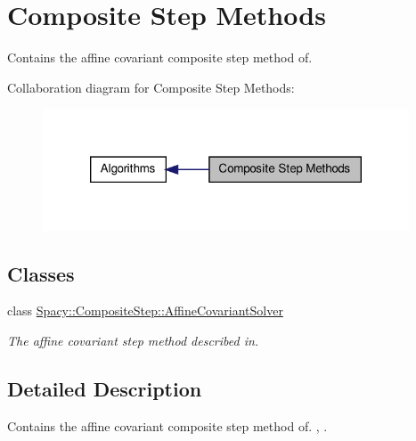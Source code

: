 \hypertarget{group__CSGroup}{\section{\-Composite \-Step \-Methods}
\label{group__CSGroup}
}


\-Contains the affine covariant composite step method of.  


\-Collaboration diagram for \-Composite \-Step \-Methods\-:
\nopagebreak
\begin{figure}[H]
\begin{center}
\leavevmode
\includegraphics[width=308pt]{group__CSGroup}
\end{center}
\end{figure}
\subsection*{\-Classes}
\begin{DoxyCompactItemize}
\item 
class \hyperlink{classSpacy_1_1CompositeStep_1_1AffineCovariantSolver}{\-Spacy\-::\-Composite\-Step\-::\-Affine\-Covariant\-Solver}
\begin{DoxyCompactList}\small\item\em \-The affine covariant step method described in. \end{DoxyCompactList}\end{DoxyCompactItemize}


\subsection{\-Detailed \-Description}
\-Contains the affine covariant composite step method of. \cite{Lubkoll2015}, \cite{Lubkoll2015a}. 